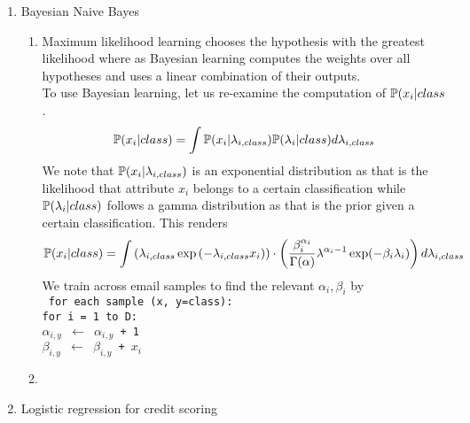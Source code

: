 \documentclass{article}
\begin{document}
\begin{enumerate}
\begin{enumerate}
        \end{enumerate}
    \item Bayesian Naive Bayes %
        \begin{enumerate}
            \item %
                Maximum likelihood learning chooses the hypothesis with the
                greatest likelihood where as Bayesian learning computes
                the weights over all hypotheses and uses a linear
                combination of their outputs. \\
                To use Bayesian learning, let us re-examine the computation
                of \(\mathbb{P}(x_i|class\).
                \begin{equation*}
                  \mathbb{P}(x_i|class)
                  =  \int \mathbb{P}(x_i|\lambda_{i,class})\mathbb{P}(\lambda_i|class) d\lambda_{i,class}
                \end{equation*}
                We note that \(\mathbb{P}(x_i|\lambda_{i,class})\) is an exponential distribution as
                that is the likelihood that attribute \(x_i\) belongs to a certain classification
                while \(\mathbb{P}(\lambda_i|class)\) follows a gamma distribution as that is the prior
                given a certain classification. This renders
                \begin{equation*}
                  \mathbb{P}(x_i|class)
                  =  \int \left(\lambda_{i,class}\exp\left(-\lambda_{i,class}x_i\right)\right)
                  \cdot\left(\frac{\beta_i^{\alpha_i}}{\Gamma(\alpha)}\lambda^{\alpha_i-1}
                  \exp(-\beta_i\lambda_i)\right) d\lambda_{i,class}
                \end{equation*}
                We train across email samples to find the relevant \(\alpha_i,\beta_i\) by \\
                \texttt{
                  \tab for each sample (x, y=class): \\
                  \tab\tab for i = 1 to D: \\
                  \tab\tab\tab\(\alpha_{i,y}\) \(\leftarrow\) \(\alpha_{i,y}\) + 1 \\
                  \tab\tab\tab\(\beta_{i,y}\) \(\leftarrow\) \(\beta_{i,y}\) + \(x_i\)
                }   
            \item %
        \end{enumerate}
    \item Logistic regression for credit scoring %
        \begin{enumerate}

\end{enumerate}
\end{enumerate}
\end{document}
